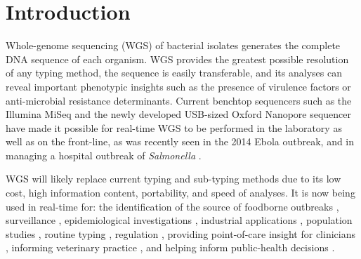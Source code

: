 \documentclass[doublespacing, linenumbers]{bmcart}
\begin{document}


\section*{Introduction}
Whole-genome sequencing (WGS) of bacterial isolates generates the complete DNA sequence of each organism. WGS provides the greatest possible resolution of any typing method, the sequence is easily transferable, and its analyses can reveal important phenotypic insights such as the presence of virulence factors or anti-microbial resistance determinants. Current benchtop sequencers such as the Illumina MiSeq and the newly developed USB-sized Oxford Nanopore sequencer have made it possible for real-time WGS to be performed in the laboratory as well as on the front-line, as was recently seen in the 2014 Ebola outbreak, and in managing a hospital outbreak of \textit{Salmonella} \cite{jones_technology:_2015,gilchrist_whole-genome_2015,birmingham_how_2015,quick_rapid_2015}.

WGS will likely replace current typing and sub-typing methods due to its low cost, high information content, portability, and speed of analyses. It is now being used in real-time for: the identification of the source of foodborne outbreaks \cite{graham_real-time_2014}, surveillance \cite{zankari_genotyping_2013,cody_real-time_2013},  epidemiological investigations \cite{cody_real-time_2013}, industrial applications \cite{andreevskaya_genome_2015,mazzaglia_pseudomonas_2012}, population studies \cite{nasser_evolutionary_2014,kopac_genomic_2014}, routine typing \cite{zhang_salmonella_2015}, regulation \cite{halachev_genomic_2014},  providing point-of-care insight for clinicians \cite{grad_epidemiologic_2014,jr_next-generation_2012}, informing veterinary practice \cite{biek_whole_2012}, and helping inform public-health decisions \cite{lemke_stakeholder_2015}.
\end{document}
